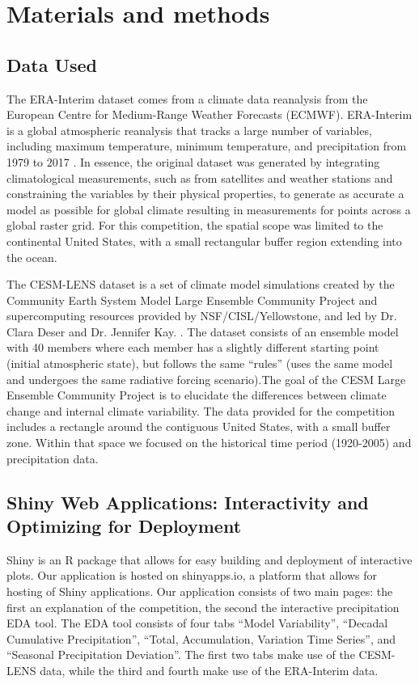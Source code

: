 \documentclass[10pt,letterpaper]{article}
\begin{document}
\section*{Materials and methods}

\subsection*{Data Used}

The ERA-Interim dataset comes from a climate data reanalysis from the European Centre for Medium-Range Weather Forecasts (ECMWF). ERA-Interim is a global atmospheric reanalysis that tracks a large number of variables, including maximum temperature, minimum temperature, and precipitation from 1979 to 2017 \cite{era}. In essence, the original dataset was generated by integrating climatological measurements, such as from satellites and weather stations and constraining the variables by their physical properties, to generate as accurate a model as possible for global climate resulting in measurements for points across a global raster grid. For this competition, the spatial scope was limited to the continental United States, with a small rectangular buffer region extending into the ocean.

The CESM-LENS dataset is a set of climate model simulations created by the Community Earth System Model Large Ensemble Community Project and supercomputing resources provided by NSF/CISL/Yellowstone, and led by Dr. Clara Deser and Dr. Jennifer Kay. \cite{CESM}. The dataset consists of an ensemble model with 40 members where each member has a slightly different starting point (initial atmospheric state), but follows the same “rules” (uses the same model and undergoes the same radiative forcing scenario)\cite{kotu_deshpande_2019}.The goal of the CESM Large Ensemble Community Project is to elucidate the differences between climate change and internal climate variability.  The data provided for the competition includes a rectangle around the contiguous United States, with a small buffer zone. Within that space we focused on the historical time period (1920-2005) and precipitation data.


\subsection*{Shiny Web Applications: Interactivity and Optimizing for Deployment}


Shiny\cite{shiny} is an R package that allows for easy building and deployment of interactive plots. Our application is hosted on shinyapps.io, a platform that allows for hosting of Shiny applications. Our application consists of two main pages: the first an explanation of the competition, the second the interactive precipitation EDA tool. The EDA tool consists of four tabs “Model Variability”, “Decadal Cumulative Precipitation”, “Total, Accumulation, Variation Time Series”, and “Seasonal Precipitation Deviation”. The first two tabs make use of the CESM-LENS data, while the third and fourth make use of the ERA-Interim data.
\end{document}
